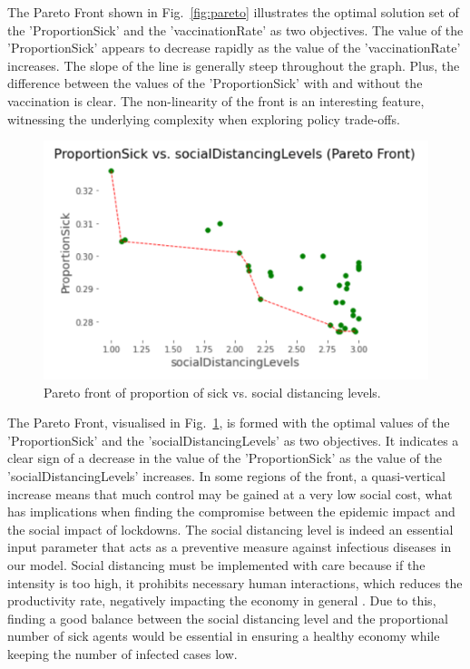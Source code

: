 \documentclass[smallextended]{svjour3}       %
\begin{document}
The Pareto Front shown in Fig.~\ref{fig:pareto} illustrates the optimal solution set of the 'ProportionSick' and the 'vaccinationRate' as two objectives. The value of the 'ProportionSick' appears to decrease rapidly as the value of the 'vaccinationRate' increases. The slope of the line is generally steep throughout the graph. Plus, the difference between the values of the 'ProportionSick' with and without the vaccination is clear. The non-linearity of the front is an interesting feature, witnessing the underlying complexity when exploring policy trade-offs.


\begin{figure}
	\centering
	\includegraphics[width=\linewidth]{figures/pareto2.png}
	\caption{Pareto front of proportion of sick vs. social distancing levels.\label{fig:pareto2}}	
\end{figure}



The Pareto Front, visualised in Fig.~\ref{fig:pareto2}, is formed with the optimal values of the 'ProportionSick' and the 'socialDistancingLevels' as two objectives. It indicates a clear sign of a decrease in the value of the 'ProportionSick' as the value of the 'socialDistancingLevels' increases. In some regions of the front, a quasi-vertical increase means that much control may be gained at a very low social cost, what has implications when finding the compromise between the epidemic impact and the social impact of lockdowns. The social distancing level is indeed an essential input parameter that acts as a preventive measure against infectious diseases in our model. Social distancing must be implemented with care because if the intensity is too high, it prohibits necessary human interactions, which reduces the productivity rate, negatively impacting the economy in general \cite{deluca2020unequal}. Due to this, finding a good balance between the social distancing level and the proportional number of sick agents would be essential in ensuring a healthy economy while keeping the number of infected cases low.
\end{document}
